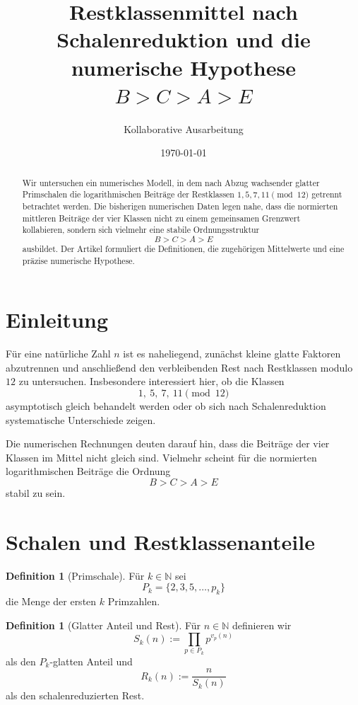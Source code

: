 \documentclass[11pt,a4paper]{article}
\title{Restklassenmittel nach Schalenreduktion und die numerische Hypothese \(B>C>A>E\)}
\author{Kollaborative Ausarbeitung}
\date{\today}
\theoremstyle{definition}
\newtheorem{definition}[satz]{Definition}
\theoremstyle{remark}
\begin{document}
	\maketitle
	
	\begin{abstract}
		Wir untersuchen ein numerisches Modell, in dem nach Abzug wachsender glatter Primschalen
		die logarithmischen Beiträge der Restklassen \(1,5,7,11 \pmod{12}\) getrennt betrachtet werden.
		Die bisherigen numerischen Daten legen nahe, dass die normierten mittleren Beiträge der vier
		Klassen nicht zu einem gemeinsamen Grenzwert kollabieren, sondern sich vielmehr eine stabile
		Ordnungsstruktur
		\[
		B>C>A>E
		\]
		ausbildet. Der Artikel formuliert die Definitionen, die zugehörigen Mittelwerte und eine
		präzise numerische Hypothese.
	\end{abstract}
	
	\section{Einleitung}
	
	Für eine natürliche Zahl \(n\) ist es naheliegend, zunächst kleine glatte Faktoren abzutrennen
	und anschließend den verbleibenden Rest nach Restklassen modulo \(12\) zu untersuchen.
	Insbesondere interessiert hier, ob die Klassen
	\[
	1,\ 5,\ 7,\ 11 \pmod{12}
	\]
	asymptotisch gleich behandelt werden oder ob sich nach Schalenreduktion systematische
	Unterschiede zeigen.
	
	Die numerischen Rechnungen deuten darauf hin, dass die Beiträge der vier Klassen im Mittel
	nicht gleich sind. Vielmehr scheint für die normierten logarithmischen Beiträge die Ordnung
	\[
	B>C>A>E
	\]
	stabil zu sein.
	
	\section{Schalen und Restklassenanteile}
	
	\begin{definition}[Primschale]
		Für \(k\in\mathbb N\) sei
		\[
		P_k=\{2,3,5,\dots,p_k\}
		\]
		die Menge der ersten \(k\) Primzahlen.
	\end{definition}
	
	\begin{definition}[Glatter Anteil und Rest]
		Für \(n\in\mathbb N\) definieren wir
		\[
		S_k(n):=\prod_{p\in P_k} p^{v_p(n)}
		\]
		als den \(P_k\)-glatten Anteil und
		\[
		R_k(n):=\frac{n}{S_k(n)}
		\]
		als den schalenreduzierten Rest.
	\end{definition}
	
\end{document}
